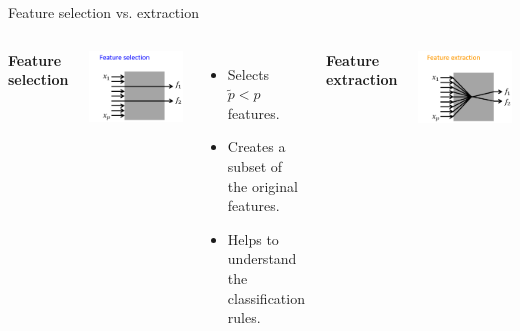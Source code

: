 \begin{vbframe}{Feature selection vs. extraction}

\begin{columns}

\textbf{Feature selection}

\medskip

\includegraphics{figure_man/feature_selection.png}

\smallskip

\begin{itemize}
  \item Selects $\tilde{p} < p$ features.
  \item Creates a subset of the original features.
  \item Helps to understand the classification rules.
\end{itemize}

\textbf{Feature extraction}

\medskip

\includegraphics{figure_man/feature_extraction.png}


\end{columns}
\end{vbframe}
